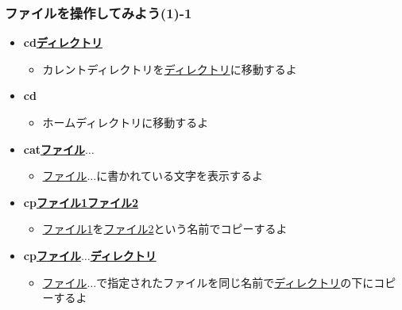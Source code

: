 \documentclass[slide03.tex]{subfiles}
\begin{document}
\begin{frame}
    \frametitle{ファイルを操作してみよう(1)-1}
    \begin{itemize}
    \item {\bf cd\textvisiblespace\underline{ディレクトリ}}
    \begin{itemize}
        \small
        \item[] カレントディレクトリを\underline{ディレクトリ}に移動するよ
    \end{itemize}
    \item {\bf cd}
    \begin{itemize}
        \small
        \item[] ホームディレクトリに移動するよ
    \end{itemize}
    \item {\bf cat\textvisiblespace\underline{ファイル}$\ldots$}
    \begin{itemize}
        \small
        \item[] \underline{ファイル}$\ldots$に書かれている文字を表示するよ
    \end{itemize}
    \item {\bf cp\textvisiblespace\underline{ファイル1}\textvisiblespace\underline{ファイル2}}
    \begin{itemize}
        \small
        \item[] \underline{ファイル1}を\underline{ファイル2}という名前でコピーするよ
    \end{itemize}
    \item {\bf cp\textvisiblespace\underline{ファイル}$\ldots$\textvisiblespace\underline{ディレクトリ}}
    \begin{itemize}
        \small
        \item[] \underline{ファイル}$\ldots$で指定されたファイルを同じ名前で\underline{ディレクトリ}の下にコピーするよ
    \end{itemize}
    \end{itemize}
\end{frame}
\end{document}
